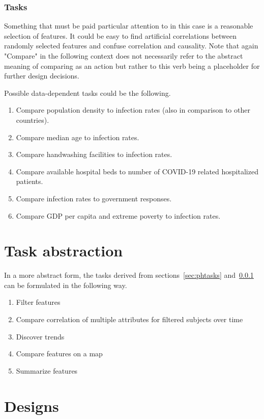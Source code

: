 \documentclass[11pt]{article}
\begin{document}
\subsubsection{Tasks}
\label{sec:govtasks}
Something that must be paid particular attention to in this case is a reasonable selection of features. It could be easy to find artificial correlations between 
randomly selected features and confuse correlation and causality. Note that again "Compare" in the following context does not necessarily refer to the abstract meaning 
of comparing as an action but rather to this verb being a placeholder for further design decisions.

Possible data-dependent tasks could be the following.
\begin{enumerate}[leftmargin=*, labelindent=1.5em, label={GOV\arabic*.}]
  \item Compare population density to infection rates (also in comparison to other countries).
  \item Compare median age to infection rates.
  \item Compare handwashing facilities to infection rates.
  \item Compare available hospital beds to number of COVID-19 related hospitalized patients.
  \item Compare infection rates to government responses.
  \item Compare GDP per capita and extreme poverty to infection rates.
\end{enumerate}

\section{Task abstraction}
\label{sec:abstraction}
In a more abstract form, the tasks derived from sections~\ref{sec:phtasks} and~\ref{sec:govtasks} can be formulated in the following way.

\begin{enumerate}[leftmargin=*, labelindent=1.5em, label={T\arabic*.}]
  \item Filter features
  \item Compare correlation of multiple attributes for filtered subjects over time
  \item Discover trends 
  \item Compare features on a map
  \item Summarize features
\end{enumerate}

\section{Designs}
\end{document}
